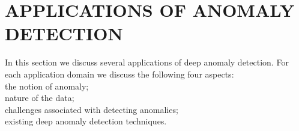 \section{APPLICATIONS OF ANOMALY DETECTION}
\label{sec:applicationsOfDLAD}

In this section we discuss several applications of deep anomaly detection. For each application
domain we discuss the following four aspects:\\
\textemdash the notion of anomaly;\\
\textemdash nature of the data;\\
\textemdash challenges associated with detecting anomalies;\\
\textemdash existing deep anomaly detection techniques.\\


\label{sec:intrusionDetect}


\label{sec:fraudDetection}


\label{sec:malwareDetection}


\label{sec:medicalAnomalyDetect}



\label{sec:socialNetworks}



\label{sec:logAnomaly}



\label{sec:iotBigDataAnomaly}


\label{sec:industrialDamageDetect}


\label{sec:sensorNetworkAnomaly}



\label{sec:videoSurvelliance}












